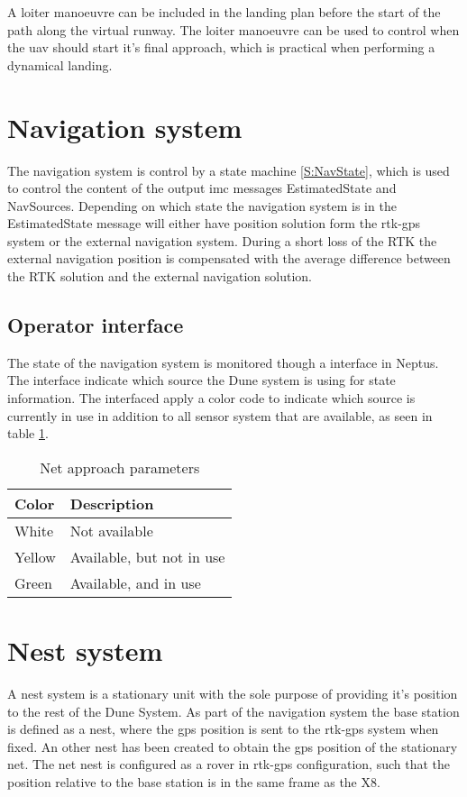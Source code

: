 A loiter manoeuvre can be included in the landing plan before the start of the path along the virtual runway. The loiter manoeuvre can be used to control when the \gls{uav} should start it's final approach, which is practical when performing a dynamical landing.
\section{Navigation system}
The navigation system is control by a state machine \ref{S:NavState}, which is used to control the content of the output \gls{imc} messages EstimatedState and NavSources. Depending on which state the navigation system is in the EstimatedState message will either have position solution form the \gls{rtk-gps} system or the external navigation system. During a short loss of the RTK the external navigation position is compensated with the average difference between the RTK solution and the external navigation solution.
\subsection{Operator interface}
The state of the navigation system is monitored though a interface in Neptus. The interface indicate which source the Dune system is using for state information. The interfaced apply a color code to indicate which source is currently in use in addition to all sensor system that are available, as seen in table \ref{Tb:Color Code}.
\begin{table}[H]
\begin{center}
    \begin{tabular}{ | l | l |}
    \hline
    \textbf{Color} & \textbf{Description} \\ \hline
    White & Not available \\ \hline
    Yellow & Available, but not in use \\ \hline
    Green & Available, and in use \\ \hline
    \end{tabular}
\end{center}
\caption{Net approach parameters }
\label{Tb:Color Code}
\end{table}
\section{Nest system}
A nest system is a stationary unit with the sole purpose of providing it's position to the rest of the Dune System. As part of the navigation system the base station is defined as a nest, where the \gls{gps} position is sent to the \gls{rtk-gps} system when fixed.
An other nest has been created to obtain the \gls{gps} position of the stationary net. The net nest is configured as a rover in \gls{rtk-gps} configuration, such that the position relative to the base station is in the same frame as the X8.
